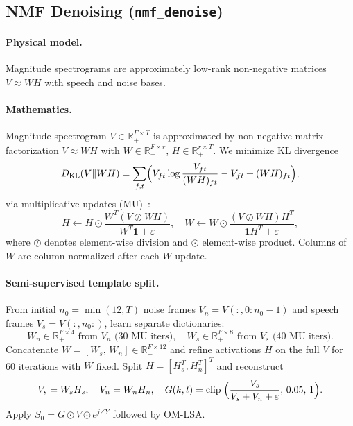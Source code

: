 \subsection{NMF Denoising (\texttt{nmf\_denoise})}

\paragraph{Physical model.}
Magnitude spectrograms are approximately low-rank non-negative matrices $V\approx WH$ with speech and noise bases.

\paragraph{Mathematics.}
Magnitude spectrogram $V\in\mathbb{R}^{F\times T}_+$ is approximated by non-negative matrix factorization $V\approx WH$ with $W\in\mathbb{R}^{F\times r}_+$, $H\in\mathbb{R}^{r\times T}_+$. We minimize KL divergence
\begin{equation}
  D_{\mathrm{KL}}(V\|WH) = \sum_{f,t}\Bigl(V_{ft}\log\frac{V_{ft}}{(WH)_{ft}} - V_{ft} + (WH)_{ft}\Bigr),
  \label{eq:nmf_kl}
\end{equation}
via multiplicative updates (MU)~\cite{lee1999}:
\begin{equation}
  H \leftarrow H \odot \frac{W^T(V \oslash WH)}{W^T \mathbf{1} + \varepsilon}, \quad
  W \leftarrow W \odot \frac{(V \oslash WH)H^T}{\mathbf{1}H^T + \varepsilon},
  \label{eq:nmf_mu}
\end{equation}
where $\oslash$ denotes element-wise division and $\odot$ element-wise product. Columns of $W$ are column-normalized after each $W$-update.

\paragraph{Semi-supervised template split.}
From initial $n_0=\min(12,T)$ noise frames $V_n=V(:,0:n_0-1)$ and speech frames $V_s=V(:,n_0:)$, learn separate dictionaries:
\begin{equation}
  W_n\in\mathbb{R}^{F\times 4}_+ \text{ from } V_n \text{ (30 MU iters)}, \quad
  W_s\in\mathbb{R}^{F\times 8}_+ \text{ from } V_s \text{ (40 MU iters)}.
\end{equation}
Concatenate $W=[W_s,\, W_n]\in\mathbb{R}^{F\times 12}_+$ and refine activations $H$ on the full $V$ for 60 iterations with $W$ fixed. Split $H=[H_s^T,H_n^T]^T$ and reconstruct
\begin{equation}
  V_s = W_s H_s, \quad V_n = W_n H_n, \quad
  G(k,t) = \mathrm{clip}\;\Bigl(\frac{V_s}{V_s + V_n + \varepsilon},\, 0.05,\, 1\Bigr).
  \label{eq:nmf_gain}
\end{equation}
Apply $S_0 = G\odot V \odot e^{j\angle Y}$ followed by OM-LSA.

